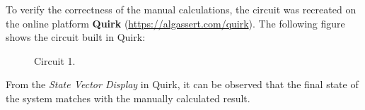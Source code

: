 To verify the correctness of the manual calculations, the circuit was recreated on the online platform \textbf{Quirk} (\url{https://algassert.com/quirk}).
The following figure shows the circuit built in Quirk:
\begin{figure}[h]

    \centering

    \caption{Circuit 1.}
        \label{fig:circuit_1}
\end{figure}
From the \textit{State Vector Display} in Quirk, it can be observed that the final state of the system matches with the manually calculated result.
